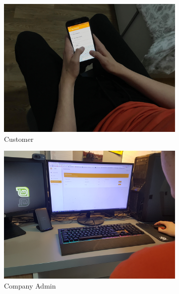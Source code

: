 \begin{figure}[!h]
	\centering
	\begin{subfigure}[b]{0.6\linewidth}
		\includegraphics[width=\linewidth]{Resources/img/user_test_customer.jpg}
		\caption{Customer}
	\end{subfigure}
	\begin{subfigure}[b]{0.6\linewidth}
		\includegraphics[width=\linewidth]{Resources/img/user_test_admin.jpg}
		\caption{Company Admin}
	\end{subfigure}
	\begin{subfigure}[b]{0.6\linewidth}

\end{subfigure}
\end{figure}
